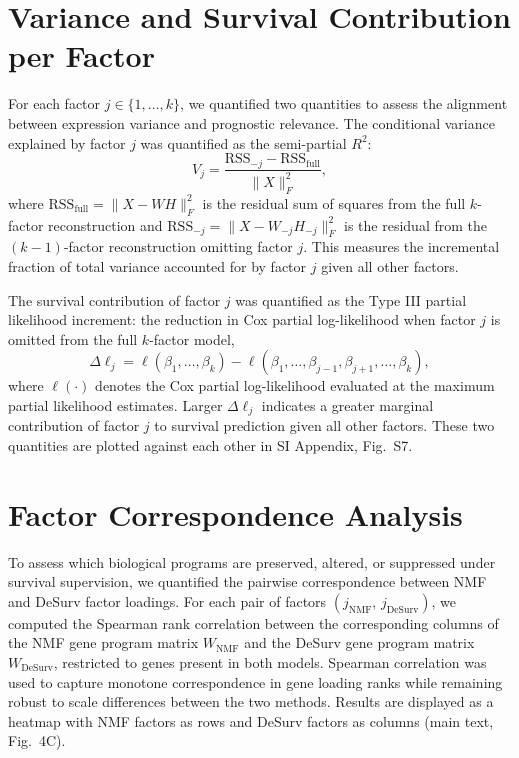 \documentclass[
]{article}
\begin{document}
\section{Variance and Survival Contribution per Factor}

For each factor \(j \in \{1, \ldots, k\}\), we quantified two quantities
to assess the alignment between expression variance and prognostic
relevance. The conditional variance explained by factor \(j\) was
quantified as the semi-partial \(R^2\):
\[V_j = \frac{\mathrm{RSS}_{-j} - \mathrm{RSS}_{\text{full}}}{\|X\|_F^2},\]
where \(\mathrm{RSS}_{\text{full}} = \|X - WH\|_F^2\) is the residual
sum of squares from the full \(k\)-factor reconstruction and
\(\mathrm{RSS}_{-j} = \|X - W_{-j}H_{-j}\|_F^2\) is the residual from
the \((k-1)\)-factor reconstruction omitting factor \(j\). This measures
the incremental fraction of total variance accounted for by factor \(j\)
given all other factors.

The survival contribution of factor \(j\) was quantified as the Type III
partial likelihood increment: the reduction in Cox partial
log-likelihood when factor \(j\) is omitted from the full \(k\)-factor
model,
\[\Delta\ell_j = \ell(\beta_1, \ldots, \beta_k) - \ell(\beta_1, \ldots,
\beta_{j-1}, \beta_{j+1}, \ldots, \beta_k),\] where \(\ell(\cdot)\)
denotes the Cox partial log-likelihood evaluated at the maximum partial
likelihood estimates. Larger \(\Delta\ell_j\) indicates a greater
marginal contribution of factor \(j\) to survival prediction given all
other factors. These two quantities are plotted against each other in SI
Appendix, Fig.~S7.

\section{Factor Correspondence Analysis}

To assess which biological programs are preserved, altered, or
suppressed under survival supervision, we quantified the pairwise
correspondence between NMF and DeSurv factor loadings. For each pair of
factors \((j_{\text{NMF}},\, j_{\text{DeSurv}})\), we computed the
Spearman rank correlation between the corresponding columns of the NMF
gene program matrix \(W_{\text{NMF}}\) and the DeSurv gene program
matrix \(W_{\text{DeSurv}}\), restricted to genes present in both
models. Spearman correlation was used to capture monotone correspondence
in gene loading ranks while remaining robust to scale differences
between the two methods. Results are displayed as a heatmap with NMF
factors as rows and DeSurv factors as columns (main text, Fig.~4C).
\end{document}
